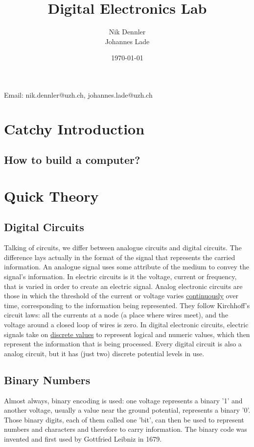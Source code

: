 \documentclass[10pt,a4paper]{article}
\author{Nik Dennler \\ Johannes Lade}
\title{Digital Electronics Lab}
\date{\today{}}
\begin{document}
	
\begin{titlepage}
	\maketitle
		\begin{center}
			Email: nik.dennler@uzh.ch, johannes.lade@uzh.ch
		\end{center}
	\thispagestyle{empty}
\end{titlepage}

\tableofcontents
\newpage

\section{Catchy Introduction}
\subsection{How to build a computer?}


\section{Quick Theory}
\subsection{Digital Circuits}
Talking of circuits, we differ between analogue circuits and digital circuits. The difference lays actually in the format of the signal that represents the carried information. \newline
An analogue signal uses some attribute of the medium to convey the signal's information. In electric circuits is it the voltage, current or frequency, that is varied in order to create an electric signal. Analog electronic circuits are those in which the threshold of the current or voltage varies \underline{continuously} over time, corresponding to the information being represented. They follow Kirchhoff's circuit laws: all the currents at a node (a place where wires meet), and the voltage around a closed loop of wires is zero. \newline
In digital electronic circuits, electric signals take on \underline{discrete values} to represent logical and numeric values, which then represent the information that is being processed. Every digital circuit is also a analog circuit, but it has (just two) discrete potential levels in use. 

\subsection{Binary Numbers}
Almost always, binary encoding is used: one voltage represents a binary '1' and another voltage, usually a value near the ground potential, represents a binary '0'. Those binary digits, each of them called one 'bit', can then be used to represent numbers and characters and therefore to carry information. The binary code was invented and first used by Gottfried Leibniz in 1679.
\end{document}
